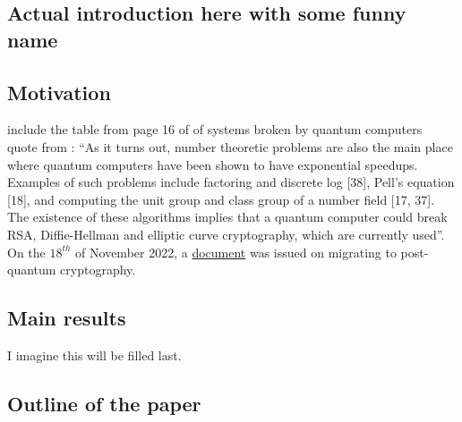 \subsection{Actual introduction here with some funny name}
\subsection{Motivation}
include the table from page 16 of \cite{bernstein} of systems broken by quantum computers\\
quote from \cite{bernstein}: ``As it turns out, number theoretic problems are also the main place where quantum computers have been shown to have exponential speedups. Examples of such problems include factoring and discrete log [38], Pell’s equation [18], and computing the unit group and class group of a number field [17, 37]. The existence of these algorithms implies that a quantum computer could break RSA, Diffie-Hellman and elliptic curve cryptography, which are currently used''.\\
On the $18^{th}$ of November 2022, a \href{https://www.whitehouse.gov/wp-content/uploads/2022/11/M-23-02-M-Memo-on-Migrating-to-Post-Quantum-Cryptography.pdf}{document} was issued on migrating to post-quantum cryptography.
\subsection{Main results}
I imagine this will be filled last.
\subsection{Outline of the paper}
